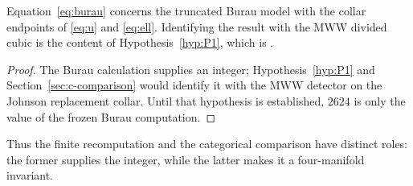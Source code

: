 \begin{proposition}\label{prop:scope}
Equation~\eqref{eq:burau} concerns the truncated Burau model with the collar
endpoints of \eqref{eq:u} and \eqref{eq:ell}.  Identifying the result with
the MWW divided cubic is the content of Hypothesis~\ref{hyp:P1}, which is
\Open.
\end{proposition}

\begin{proof}
The Burau calculation supplies an integer; Hypothesis~\ref{hyp:P1} and
Section~\ref{sec:c-comparison} would identify it with the MWW detector on
the Johnson replacement collar.  Until that hypothesis is established,
$2624$ is only the value of the frozen Burau computation.
\end{proof}

Thus the finite recomputation and the categorical comparison have distinct
roles: the former supplies the integer, while the latter makes it a
four-manifold invariant.


